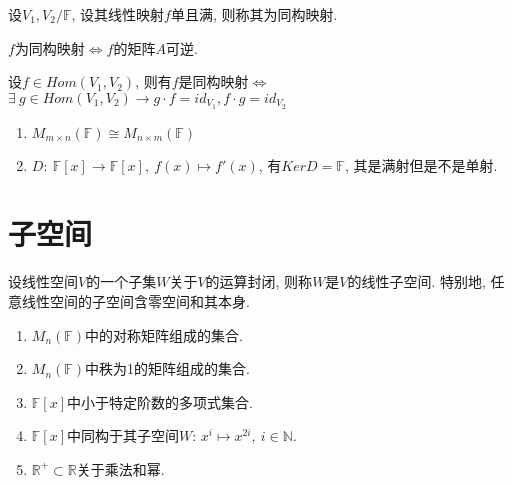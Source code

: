 \begin{definition}[同构映射]
    设$V_1, V_2 / \mathbb{F}$, 设其线性映射$f$单且满, 则称其为同构映射.
\end{definition}

\begin{inference}
    $f$为同构映射$\Longleftrightarrow$$f$的矩阵$A$可逆.
\end{inference}

\begin{lemma}
    设$f \in Hom(V_1, V_2)$, 则有$f$是同构映射$\Longleftrightarrow$$\exists \ g \in Hom(V_1, V_2) \rightarrow g \cdot f = id_{V_1}, f \cdot g = id_{V_2}$    
\end{lemma}

\begin{example}
    \begin{enumerate}[itemindent=1em]
        \item $M_{m \times n}(\mathbb{F}) \cong M_{n \times m}(\mathbb{F})$
        \item $D: \ \mathbb{F}[x] \to \mathbb{F}[x], \ f(x) \mapsto f'(x)$, 有$KerD = \mathbb{F}$, 其是满射但是不是单射.
    \end{enumerate}
\end{example}

\section{ 子空间 }

\begin{definition}[子空间]
    设线性空间$V$的一个子集$W$关于$V$的运算封闭, 则称$W$是$V$的线性子空间. 特别地, 任意线性空间的子空间含零空间和其本身.
\end{definition}

\begin{example}
    \begin{enumerate}[itemindent=1em]
        \item $M_{n}(\mathbb{F})$中的对称矩阵组成的集合.
        \item $M_n(\mathbb{F})$中秩为1的矩阵组成的集合.
        \item $\mathbb{F}[x]$中小于特定阶数的多项式集合.
        \item $\mathbb{F}[x]$中同构于其子空间$W$: $x^i \mapsto x^{2i},\ i \in \mathbb{N}$.
        \item $\mathbb{R^+} \subset \mathbb{R}$关于乘法和幂.
    \end{enumerate}
\end{example}

